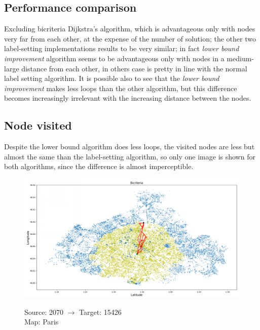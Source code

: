 \documentclass[a4paper,11pt]{report}
\begin{document}
\subsection{Performance comparison}
Excluding bicriteria Dijkstra's algorithm, which is advantageous only with nodes very far from each other, at the expense of the number of solution; the other two label-setting implementations results to be very similar; in fact \textit{lower bound improvement} algorithm seems to be advantageous only with nodes in a medium-large distance from each other, in others case is pretty in line with the normal label setting algorithm. It is possible also to see that the \textit{lower bound improvement} makes less loops than the other algorithm, but this difference becomes increasingly irrelevant with the increasing distance between the nodes.
\subsection{Node visited}
Despite the lower bound algorithm does less loops, the visited nodes are less but almost the same than the label-setting algorithm, so only one image is shown for both algorithms, since the difference is almost imperceptible.
\begin{figure}[H]
	\centering
	\includegraphics[width=\textwidth]{img/mapOutput/2070-15426Bicriteria.png}
	\label{fig:Bicriteria1}
	\hfill
	\begin{center}
		Source: 2070 $\to$ Target: 15426\\Map: Paris
	\end{center}
\end{figure}
\end{document}
